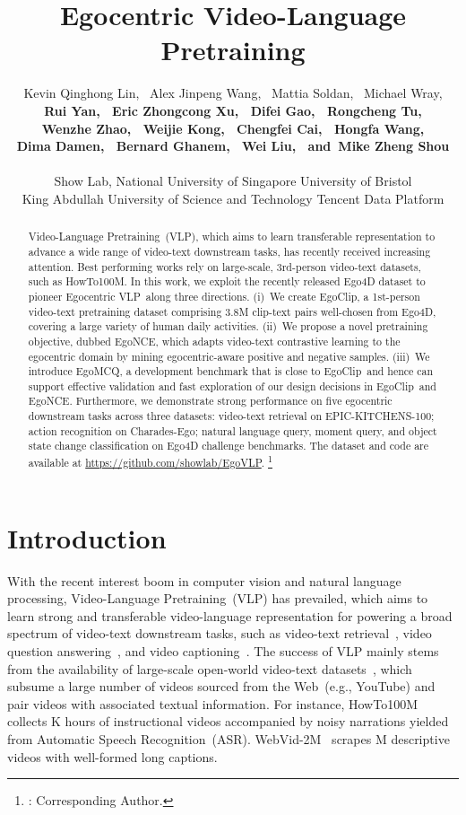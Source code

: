 \documentclass{article}
\title{Egocentric Video-Language Pretraining}
\author{Kevin Qinghong Lin,~
	Alex Jinpeng Wang,~
	Mattia Soldan,~
	Michael Wray,\\
\textbf{
	Rui Yan,~
	Eric Zhongcong Xu,~
	Difei Gao,~
	Rongcheng Tu,}\\
\textbf{
	Wenzhe Zhao,~
	Weijie Kong,~
	Chengfei Cai,~
	Hongfa Wang,}\\
\textbf{
    Dima Damen,~
	Bernard Ghanem,~
	Wei Liu,~
	and~Mike Zheng Shou\textsuperscript{\Letter}}
	\\\\
	Show Lab, National University of Singapore\quad
	University of Bristol\\
	King Abdullah University of Science and Technology\quad 
	Tencent Data Platform
}
\newcommand{\vlp}{Egocentric VLP}
\newcommand{\dataset}{EgoClip}
\newcommand{\model}{EgoNCE\xspace}
\newcommand{\eval}{EgoMCQ}
\newcommand{\epic}{EPIC-KITCHENS-100}
\newcommand{\web}{WebVid-2M}
\newcommand{\howto}{HowTo100M}
\begin{document}
\maketitle
\newcommand\blfootnote[1]{\begingroup
  \renewcommand\thefootnote{}\footnote{#1}\addtocounter{footnote}{-1}\endgroup
}

\begin{abstract}
Video-Language Pretraining~(VLP), which aims to learn transferable representation to advance a wide range of video-text downstream tasks, has recently received increasing attention. 
Best performing works rely on large-scale, 3rd-person video-text datasets, such as HowTo100M.
In this work, we exploit the recently released Ego4D dataset to pioneer \vlp~along three directions.
(i)~We create \dataset, a 1st-person video-text pretraining dataset comprising 3.8M clip-text pairs well-chosen from Ego4D, covering a large variety of human daily activities.
(ii)~We propose a novel pretraining objective, dubbed \model, which adapts video-text contrastive learning to the egocentric domain by mining egocentric-aware positive and negative samples.
(iii)~We introduce \eval, a development benchmark that is close to \dataset~and hence can support effective validation and fast exploration of our design decisions in \dataset~and \model.
Furthermore, we demonstrate strong performance on five egocentric downstream tasks across three datasets: video-text retrieval on \epic; action recognition on Charades-Ego; natural language query, moment query, and object state change classification on Ego4D challenge benchmarks.
The dataset and code are available at \textcolor{Fuchsia}{\url{https://github.com/showlab/EgoVLP}}.\blfootnote{\Letter: Corresponding Author.}
\end{abstract}

\section{Introduction}
With the recent interest boom in computer vision and natural language processing, Video-Language Pretraining~(VLP) has prevailed, which aims to learn strong and transferable video-language representation for powering a broad spectrum of video-text downstream tasks, such as video-text retrieval~\cite{xu2016msr, patrick2020support, bain2021frozen}, video question answering~\cite{msrvttqamsvdqa,yu2018joint,zhu2020actbert}, and video captioning~\cite{krishna2017dense, wang2018reconstruction, zhou2018end}.
The success of VLP mainly stems from the availability of large-scale open-world video-text datasets~\cite{miech2019howto100m}, which subsume a large number of videos sourced from the Web~(e.g., YouTube) and pair videos with associated textual information.
For instance, \howto~\cite{miech2019howto100m} collects K hours of instructional videos accompanied by noisy narrations yielded from Automatic Speech Recognition~(ASR).
\web~\cite{bain2021frozen} scrapes M descriptive videos with well-formed long captions.
\end{document}
